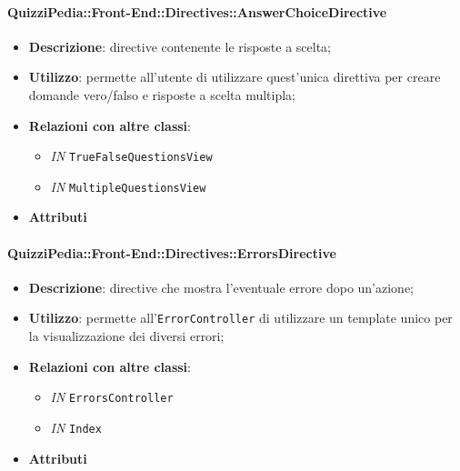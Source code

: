 \paragraph{QuizziPedia::Front-End::Directives::AnswerChoiceDirective}
\begin{itemize}
	\item \textbf{Descrizione}: directive contenente le risposte a scelta;
	\item \textbf{Utilizzo}: permette all'utente di utilizzare quest'unica direttiva per creare domande vero/falso e risposte a scelta multipla;
	\item \textbf{Relazioni con altre classi}:
	\begin{itemize}
		\item \textit{IN} \texttt{TrueFalseQuestionsView} \\
		\item \textit{IN} \texttt{MultipleQuestionsView} \\
	\end{itemize}
	\item \textbf{Attributi}
\end{itemize}

\paragraph{QuizziPedia::Front-End::Directives::ErrorsDirective}
\begin{itemize}
	\item \textbf{Descrizione}: directive che mostra l'eventuale errore dopo un'azione;
	\item \textbf{Utilizzo}: permette all'\texttt{ErrorController} di utilizzare un template unico per la visualizzazione dei diversi errori;
	\item \textbf{Relazioni con altre classi}:
	\begin{itemize}
		\item \textit{IN} \texttt{ErrorsController}
		\item \textit{IN} \texttt{Index}
	\end{itemize}
	\item \textbf{Attributi}
\end{itemize}

